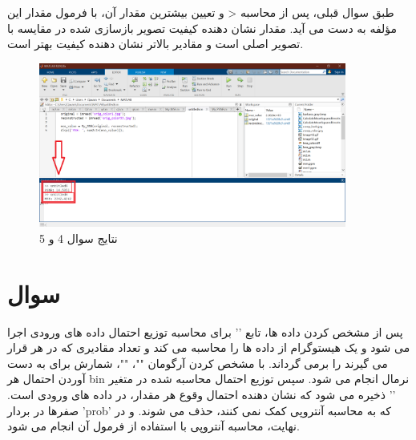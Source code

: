 \documentclass{article}
\begin{document}
	\lr{}
	
	طبق سوال قبلی، پس از محاسبه  < و تعیین بیشترین مقدار آن، با فرمول  مقدار این مؤلفه به دست می آید. مقدار  نشان دهنده کیفیت تصویر بازسازی شده در مقایسه با تصویر اصلی است و مقادیر بالاتر نشان دهنده کیفیت بهتر است. \cite{6}
	
	\begin{figure}[H]
		\centering
		\includegraphics[width=0.9\textwidth]{4_5.png}
		\caption{نتایج سوال 4 و 5}
	\end{figure}
	
	
	
	\section{سوال }
	
		\lr{}
	
پس از مشخص کردن داده ها، تابع '' برای محاسبه توزیع احتمال داده های ورودی اجرا می شود و یک هیستوگرام از داده ها را محاسبه می کند و تعداد مقادیری که در هر  قرار می گیرند را برمی گرداند. با مشخص کردن آرگومان ""، ""، شمارش برای به دست آوردن احتمال هر bin نرمال انجام می شود. سپس توزیع احتمال محاسبه شده در متغیر '' ذخیره می شود که نشان دهنده احتمال وقوع هر مقدار، در داده های ورودی است. صفرها در بردار 'prob' که به محاسبه آنتروپی کمک نمی کنند، حذف می شوند. و در نهایت، محاسبه آنتروپی با استفاده از فرمول آن انجام می شود.\cite{7}
	

	 
	 
	 \section{}
	 
\end{document}
